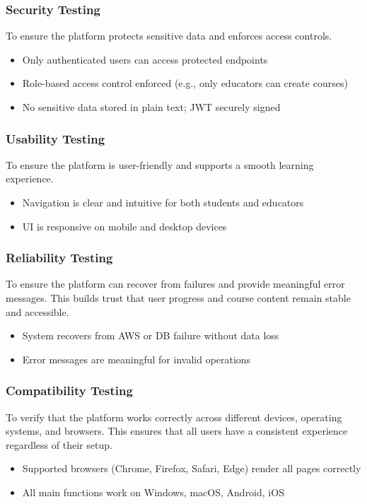 \documentclass[a4paper,11pt]{scrartcl}
\begin{document}
\subsubsection{Security Testing}
To ensure the platform protects sensitive data and enforces access controls.
\begin{itemize}[leftmargin=*]
    \item Only authenticated users can access protected endpoints
    \item Role-based access control enforced (e.g., only educators can create courses)
    \item No sensitive data stored in plain text; JWT securely signed
\end{itemize}

\subsubsection{Usability Testing}
To ensure the platform is user-friendly and supports a smooth learning experience.
\begin{itemize}[leftmargin=*]
    \item Navigation is clear and intuitive for both students and educators
    \item UI is responsive on mobile and desktop devices
\end{itemize}

\subsubsection{Reliability Testing}
To ensure the platform can recover from failures and provide meaningful error messages. This builds trust that user progress and course content remain stable and accessible.
\begin{itemize}[leftmargin=*]
    \item System recovers from AWS or DB failure without data loss
    \item Error messages are meaningful for invalid operations
\end{itemize}

\subsubsection{Compatibility Testing}
To verify that the platform works correctly across different devices, operating systems, and browsers. This ensures that all users have a consistent experience regardless of their setup.
\begin{itemize}[leftmargin=*]
    \item Supported browsers (Chrome, Firefox, Safari, Edge) render all pages correctly
    \item All main functions work on Windows, macOS, Android, iOS
\end{itemize}
\end{document}
